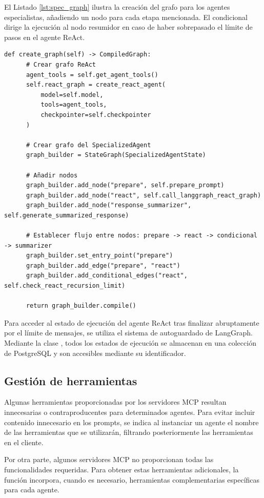 El Listado \ref{lst:spec_graph} ilustra la creación del grafo para los agentes especialistas, añadiendo un nodo para cada etapa mencionada. El condicional  dirige la ejecución al nodo resumidor en caso de haber sobrepasado el límite de pasos en el agente ReAct.

\begin{lstlisting}[caption={\protect\opus{create_graph}: grafo de agentes especializados},label={lst:spec_graph}]
  def create_graph(self) -> CompiledGraph:
      # Crear grafo ReAct
      agent_tools = self.get_agent_tools()
      self.react_graph = create_react_agent(
          model=self.model,
          tools=agent_tools,
          checkpointer=self.checkpointer
      )

      # Crear grafo del SpecializedAgent
      graph_builder = StateGraph(SpecializedAgentState)

      # Añadir nodos 
      graph_builder.add_node("prepare", self.prepare_prompt)
      graph_builder.add_node("react", self.call_langgraph_react_graph)
      graph_builder.add_node("response_summarizer", self.generate_summarized_response)

      # Establecer flujo entre nodos: prepare -> react -> condicional -> summarizer 
      graph_builder.set_entry_point("prepare")
      graph_builder.add_edge("prepare", "react")
      graph_builder.add_conditional_edges("react", self.check_react_recursion_limit)

      return graph_builder.compile()
\end{lstlisting}

Para acceder al estado de ejecución del agente ReAct tras finalizar abruptamente por el límite de mensajes, se utiliza el sistema de autoguardado de LangGraph. Mediante la clase , todos los estados de ejecución se almacenan en una colección de PostgreSQL y son accesibles mediante su identificador. 

\subsection{Gestión de herramientas}
Algunas herramientas proporcionadas por los servidores MCP resultan innecesarias o contraproducentes para determinados agentes. Para evitar incluir contenido innecesario en los prompts, se indica al instanciar un agente el nombre de las herramientas que se utilizarán, filtrando posteriormente las herramientas en el cliente.

Por otra parte, algunos servidores MCP no proporcionan todas las funcionalidades requeridas. Para obtener estas herramientas adicionales, la función  incorpora, cuando es necesario, herramientas complementarias específicas para cada agente.

